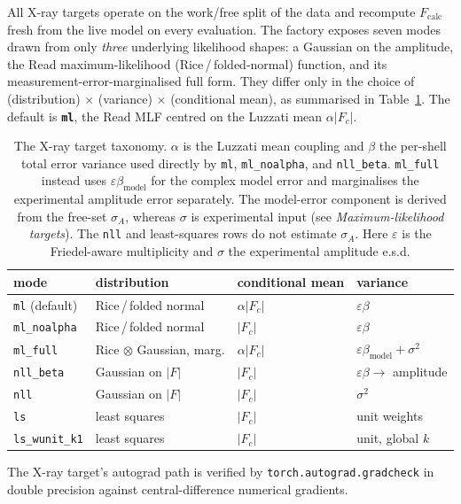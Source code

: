 \documentclass{iucrjournals}
\begin{document}
All X-ray targets operate on the work/free split of the data and recompute
$F_\mathrm{calc}$ fresh from the live model on every evaluation.
The factory exposes seven modes drawn from only \emph{three} underlying
likelihood shapes: a Gaussian on the amplitude, the Read maximum-likelihood
(Rice\,/\,folded-normal) function, and its measurement-error-marginalised
full form. They differ only in the choice of (distribution)
$\times$ (variance) $\times$ (conditional mean), as summarised in
Table~\ref{tab:xray-targets}.  The default is \textbf{\texttt{ml}}, the Read
MLF centred on the Luzzati mean $\alpha|F_{c}|$.
%
\begin{table}[h]
\centering
\small
\begin{tabular}{llll}
\hline
mode & distribution & conditional mean & variance \\
\hline
\texttt{ml} (default) & Rice\,/\,folded normal & $\alpha|F_{c}|$ & $\varepsilon\beta$ \\
\texttt{ml\_noalpha}  & Rice\,/\,folded normal & $|F_{c}|$        & $\varepsilon\beta$ \\
\texttt{ml\_full}     & Rice $\otimes$ Gaussian, marg. & $\alpha|F_{c}|$ & $\varepsilon\beta_\mathrm{model} + \sigma^{2}$ \\
\texttt{nll\_beta}    & Gaussian on $|F|$ & $|F_{c}|$ & $\varepsilon\beta \to$ amplitude \\
\texttt{nll}          & Gaussian on $|F|$ & $|F_{c}|$ & $\sigma^{2}$ \\
\texttt{ls}           & least squares & $|F_{c}|$ & unit weights \\
\texttt{ls\_wunit\_k1}& least squares & $|F_{c}|$ & unit, global $k$ \\
\hline
\end{tabular}
\caption{The X-ray target taxonomy. $\alpha$ is the Luzzati mean coupling and
$\beta$ the per-shell total error variance used directly by \texttt{ml},
\texttt{ml\_noalpha}, and \texttt{nll\_beta}. \texttt{ml\_full} instead uses
$\varepsilon\beta_\mathrm{model}$ for the complex model error and marginalises
the experimental amplitude error separately. The model-error component is
derived from the free-set $\sigma_{A}$, whereas $\sigma$ is experimental input
(see \emph{Maximum-likelihood targets}). The \texttt{nll} and
least-squares rows do not estimate $\sigma_A$. Here $\varepsilon$ is the
Friedel-aware multiplicity and $\sigma$ the experimental amplitude e.s.d.}
\label{tab:xray-targets}
\end{table}
%
The X-ray target's autograd path is verified by
\texttt{torch.autograd.gradcheck} in double precision against
central-difference numerical gradients.
\end{document}
